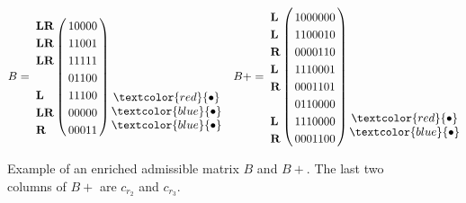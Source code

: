 \documentclass[12pt]{book}
\theoremstyle{plain}
\theoremstyle{remark}
\begin{document}
\begin{figure}
\begin{align*}
	B = \bordermatrix{ ~ &  ~ \cr
	\textbf{LR} & 1 0 0 0 0  \cr
	\textbf{LR} & 1 1 0 0 1 \cr
 	 \textbf{LR} & 1 1 1 1 1  \cr
					 & 0 1  1  0  0 \cr
	\textbf L & 1 1 1 0 0 \cr
	\textbf{LR} & 0 0 0 0 0 \cr
	\textbf R & 0 0 0 1 1  }\,
	\begin{matrix}
	\\ \\ \\ \\ \\ \textcolor{red}{\bullet} \\ \textcolor{blue}{\bullet} \\ \textcolor{blue}{\bullet} 
	\end{matrix}
	&&
B+ = \bordermatrix{ & \cr
	\textbf{L} & 1 0 0 0 0 0 0 \cr
	\textbf{L} & 1 1 0 0 0 1 0  \cr
	\textbf{R} & 0 0 0 0 1 1 0 \cr
	\textbf{L} & 1 1 1 0 0 0 1 \cr
	\textbf{R} & 0 0 0 1 1  0  1\cr
					 & 0 1  1  0  0  0  0 \cr
	\textbf L & 1 1 1 0 0 0 0 \cr
	\textbf R & 0 0 0 1 1 0 0 }\,
	\begin{matrix}
	\\ \\ \\ \\ \\ \\ \\ \textcolor{red}{\bullet} \\ \textcolor{blue}{\bullet} \\ 
	\end{matrix}
\end{align*}
\caption{Example of an enriched admissible matrix $B$ and $B+$. The last two columns of $B+$ are $c_{r_2}$ and $c_{r_3}$.} \label{fig:example_B+}
\end{figure}

\end{document}

